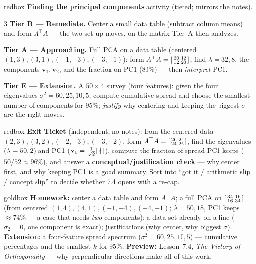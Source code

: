\documentclass[10pt]{article}
\newcommand{\vv}{\mathbf{v}}
\newcommand{\T}{^{\top}}
\begin{document}
\begin{skillbox}{redbox}
\textbf{Finding the principal components} activity (tiered; mirrors the notes).
\begin{multicols}{3}
\textbf{Tier R --- Remediate.} Center a small data table (subtract column means) and form $A\T A$ --- the two
set-up moves, on the matrix Tier~A then analyzes.

\columnbreak
\textbf{Tier A --- Approaching.} Full PCA on a data table (centered $(1,3),(3,1),(-1,-3),(-3,-1)$): form
$A\T A=\begin{bsmallmatrix} 20 & 12\\ 12 & 20 \end{bsmallmatrix}$, find $\lambda=32,8$, the components
$\vv_1,\vv_2$, and the fraction on PC1 ($80\%$) --- then \emph{interpret} PC1.

\columnbreak
\textbf{Tier E --- Extension.} A $50\times4$ survey (four features): given the four eigenvalues
$\sigma^2=60,25,10,5$, compute cumulative spread and choose the smallest number of components for $95\%$;
\emph{justify} why centering and keeping the biggest $\sigma$ are the right moves.
\end{multicols}
\end{skillbox}

\begin{skillbox}{redbox}
\textbf{Exit Ticket} (independent, no notes): from the centered data $(2,3),(3,2),(-2,-3),(-3,-2)$, form
$A\T A=\begin{bsmallmatrix} 26 & 24\\ 24 & 26 \end{bsmallmatrix}$, find the eigenvalues ($\lambda=50,2$) and
PC1 ($\vv_1=\tfrac1{\sqrt2}\begin{bsmallmatrix} 1\\1 \end{bsmallmatrix}$), compute the fraction of spread PC1
keeps ($50/52\approx96\%$), and answer a \textbf{conceptual/justification check} --- why center first, and
why keeping PC1 is a good summary. Sort into ``got it / arithmetic slip / concept slip'' to decide whether
7.4 opens with a re-cap.
\end{skillbox}

\begin{skillbox}{goldbox}
\textbf{Homework:} center a data table and form $A\T A$; a full PCA on
$\begin{bsmallmatrix} 34 & 16\\ 16 & 34 \end{bsmallmatrix}$ (from centered $(1,4),(4,1),(-1,-4),(-4,-1)$;
$\lambda=50,18$, PC1 keeps $\approx74\%$ --- a case that needs \emph{two} components); a data set already on a
line ($\sigma_2=0$, one component is exact); justifications (why center, why biggest $\sigma$).
\textbf{Extension:} a four-feature spread spectrum ($\sigma^2=60,25,10,5$) --- cumulative percentages and the
smallest $k$ for $95\%$. \textbf{Preview:} Lesson~7.4, \emph{The Victory of Orthogonality} --- why
perpendicular directions make all of this work.
\end{skillbox}
\end{document}
